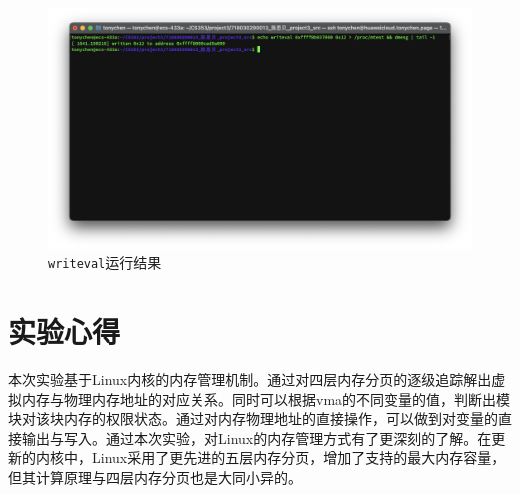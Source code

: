 \documentclass[UTF8]{ctexrep}
\begin{document}
    \begin{figure}[h!]
        \centering
        \includegraphics[width=15cm,keepaspectratio]{images/writeval.png}
        \caption{\texttt{writeval}运行结果}
        \label{fig:writeval}
    \end{figure}

    \section{实验心得}
    本次实验基于Linux内核的内存管理机制。通过对四层内存分页的逐级追踪解出虚拟内存与物理内存地址的对应关系。同时可以根据vma的不同变量的值，判断出模块对该块内存的权限状态。通过对内存物理地址的直接操作，可以做到对变量的直接输出与写入。通过本次实验，对Linux的内存管理方式有了更深刻的了解。在更新的内核中，Linux采用了更先进的五层内存分页，增加了支持的最大内存容量，但其计算原理与四层内存分页也是大同小异的。
\end{document}
